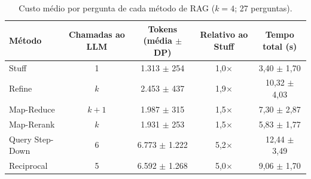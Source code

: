 \begin{table}[!t]
\centering
\footnotesize
\setlength{\tabcolsep}{4pt}
\caption{Custo médio por pergunta de cada método de RAG ($k = 4$; 27 perguntas).}
\label{tab:custo_metodos}
\begin{tabular}{lcccc}
\toprule
Método & Chamadas ao LLM & Tokens (média $\pm$ DP) & Relativo ao Stuff & Tempo total (s) \\
\midrule
Stuff & 1 & 1.313 $\pm$ 254 & 1,0$\times$ & 3,40 $\pm$ 1,70 \\
Refine & $k$ & 2.453 $\pm$ 437 & 1,9$\times$ & 10,32 $\pm$ 4,03 \\
Map-Reduce & $k+1$ & 1.987 $\pm$ 315 & 1,5$\times$ & 7,30 $\pm$ 2,87 \\
Map-Rerank & $k$ & 1.931 $\pm$ 253 & 1,5$\times$ & 5,83 $\pm$ 1,77 \\
Query Step-Down & 6 & 6.773 $\pm$ 1.222 & 5,2$\times$ & 12,44 $\pm$ 3,49 \\
Reciprocal & 5 & 6.592 $\pm$ 1.268 & 5,0$\times$ & 9,06 $\pm$ 1,70 \\
\bottomrule
\end{tabular}
\end{table}

